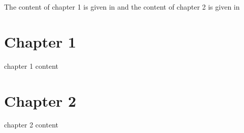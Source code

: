 


\label{0}
The content of chapter 1 is given in  and the content of chapter 2 is given in 
\chapter{Chapter 1}

\myminitoc
\label{1}





\label{2}
chapter 1 content
\chapter{Chapter 2}

\myminitoc
\label{3}





\label{4}
chapter 2 content



